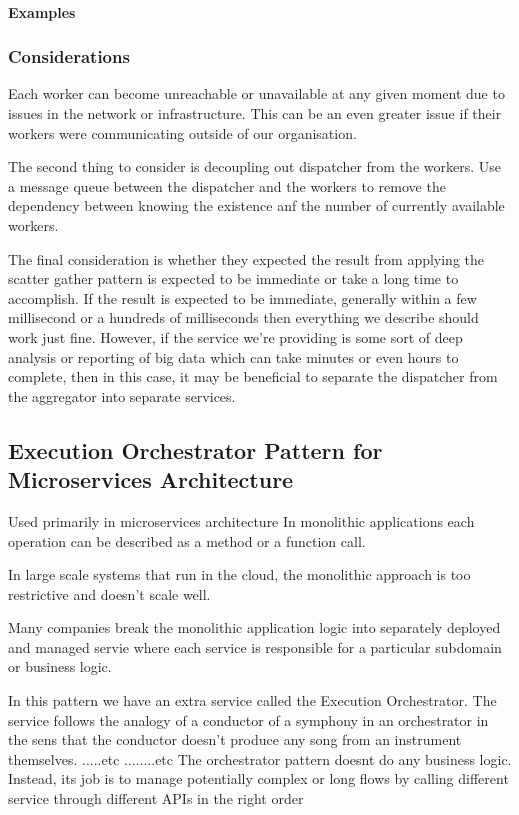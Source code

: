 \paragraph{Examples}

\subsubsection{Considerations}

Each worker can become unreachable or unavailable at any given moment due to issues in the network or infrastructure.
This can be an even greater issue if their workers were communicating outside of our organisation.

The second thing to consider is decoupling out dispatcher from the workers.
Use a message queue between the dispatcher and the workers to remove the dependency between knowing the existence anf the number of currently available workers.

The final consideration is whether they expected the result from applying the scatter gather pattern is expected to be immediate or take a long time to accomplish.
If the result is expected to be immediate, generally within a few millisecond or a hundreds of milliseconds then everything we describe should work just fine.
However, if the service we're providing is some sort of deep analysis or reporting of big data which can take minutes or even hours to complete, then in this case, it may be beneficial to separate the dispatcher from the aggregator into separate services.

\subsection{Execution Orchestrator Pattern for Microservices Architecture}
Used primarily in microservices architecture
In monolithic applications each operation can be described as a method or a function call.

In large scale systems that run in the cloud, the monolithic approach is too restrictive and doesn't scale well.

Many companies break the monolithic application logic into separately deployed and managed servie where each service is responsible for a particular subdomain or business logic.

In this pattern we have an extra service called the Execution Orchestrator.
The service follows the analogy of a conductor of a symphony in an orchestrator in the sens that the conductor doesn't produce any song from an instrument themselves.
.....etc ........etc
The orchestrator pattern doesnt do any business logic.
Instead, its job is to manage potentially complex or long flows by calling different service through different APIs in the right order

